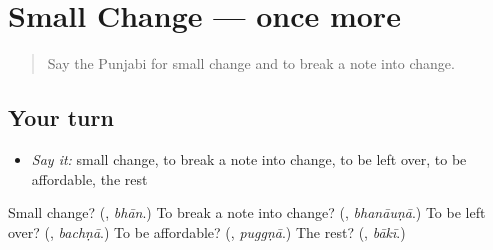 \section[(dialogue)]{Small Change — once more}

\label{lesson:PA-R280-review-final-280}



\begin{quote}
Say the Punjabi for small change and to break a note into change.
\end{quote}

\subsection*{Your turn}
\begin{itemize}
\raggedright
  \item \emph{Say it:} small change, to break a note into change, to be left over, to be affordable, the rest
\end{itemize}

\begin{tcolorbox}[breakable,colback=teal!4,colframe=teal!35!black,title={Before you move on}]
Small change? (\textbf{}, \emph{bhān}.) To break a note into change? (\textbf{}, \emph{bhanāuṇā}.) To be left over? (\textbf{}, \emph{bachṇā}.) To be affordable? (\textbf{}, \emph{puggṇā}.) The rest? (\textbf{}, \emph{bākī}.)
\end{tcolorbox}
